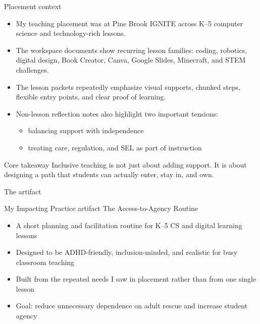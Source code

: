 \documentclass[aspectratio=169,11pt]{beamer}
\begin{document}
\begin{frame}{Placement context}
\begin{itemize}
  \item My teaching placement was at Pine Brook IGNITE across K--5 computer science and technology-rich lessons.
  \item The workspace documents show recurring lesson families: coding, robotics, digital design, Book Creator, Canva, Google Slides, Minecraft, and STEM challenges.
  \item The lesson packets repeatedly emphasize visual supports, chunked steps, flexible entry points, and clear proof of learning.
  \item Non-lesson reflection notes also highlight two important tensions:
  \begin{itemize}
    \item balancing support with independence
    \item treating care, regulation, and SEL as part of instruction
  \end{itemize}
\end{itemize}

\vspace{0.2cm}
\begin{alertblock}{Core takeaway}
Inclusive teaching is not just about adding support. It is about designing a path that students can actually enter, stay in, and own.
\end{alertblock}
\end{frame}

\begin{frame}{The artifact}
\begin{block}{My Impacting Practice artifact}
\Large The Access-to-Agency Routine
\end{block}

\vspace{0.2cm}
\begin{itemize}
  \item A short planning and facilitation routine for K--5 CS and digital learning lessons
  \item Designed to be ADHD-friendly, inclusion-minded, and realistic for busy classroom teaching
  \item Built from the repeated needs I saw in placement rather than from one single lesson
  \item Goal: reduce unnecessary dependence on adult rescue and increase student agency
\end{itemize}
\end{frame}
\end{document}
